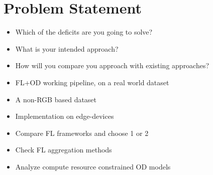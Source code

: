 \documentclass[thesis]{mas_proposal}
\begin{document}
\section{Problem Statement}
\begin{itemize}


      \item Which of the deficits are you going to solve?
      \item What is your intended approach?
      \item How will you compare you approach with existing approaches?
      \item FL+OD working pipeline, on a real world dataset
      \item A non-RGB based dataset
      \item Implementation on edge-devices
      \item Compare FL frameworks and choose 1 or 2
      \item Check FL aggregation methods
      \item Analyze compute resource constrained OD models



\end{itemize}
\end{document}
